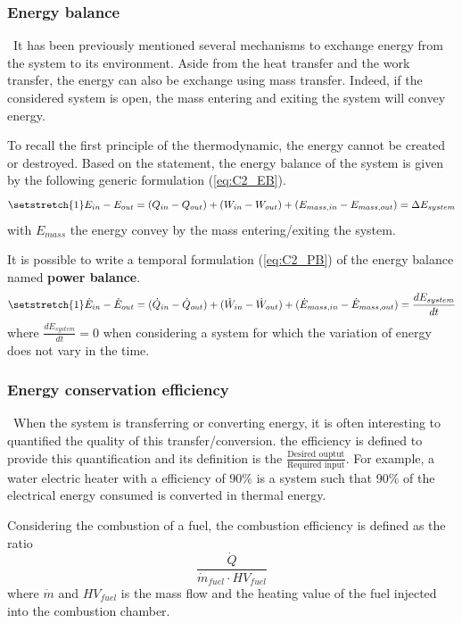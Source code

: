\subsubsection{Energy balance}
\quad\, It has been previously mentioned several mechanisms to exchange energy from the system to its environment. Aside from the heat transfer and the work transfer, the energy can also be exchange using mass transfer. Indeed, if the considered system is open, the mass entering and exiting the system will convey energy.

To recall the first principle of the thermodynamic, the energy cannot be created or destroyed. Based on the statement, the energy balance of the system is given by the following generic formulation (\ref{eq:C2_EB}).
\begin{equation}
\setstretch{1}
    E_{in} - E_{out} = (Q_{in} - Q_{out}) + (W_{in} - W_{out}) + (E_{mass,in} - E_{mass,out}) = \Delta E_{system} \label{eq:C2_EB}
\end{equation}
with $E_{mass}$ the energy convey by the mass entering/exiting the system.

It is possible to write a temporal formulation (\ref{eq:C2_PB}) of the energy balance named \textbf{power balance}.  
\begin{equation}
\setstretch{1}
    \dot{E}_{in} - \dot{E}_{out} = (\dot{Q}_{in} - \dot{Q}_{out}) + (\dot{W}_{in} - \dot{W}_{out}) + (\dot{E}_{mass,in} - \dot{E}_{mass,out}) = \frac{dE_{system}}{dt} \label{eq:C2_PB}
\end{equation}
where $\frac{dE_{system}}{dt}=0$ when considering a system for which the variation of energy does not vary in the time.

\subsubsection{Energy conservation efficiency}
\quad\, When the system is transferring or converting energy, it is often interesting to quantified the quality of this transfer/conversion. the efficiency is defined to provide this quantification and its definition is the
$\frac{\text{Desired ouptut}}{\text{Required input}}$. For example, a water electric heater with a efficiency of 90\% is a system such that 90\% of the electrical energy consumed is converted in thermal energy.  

Considering the combustion of a fuel, the combustion efficiency is defined as the ratio
$$ \frac{\dot{Q}}{\dot{m}_{fuel}\cdot HV_{fuel}}$$
where $\dot{m}$  and $HV_{fuel}$ is the mass flow and the heating value of the fuel injected into the combustion chamber.
